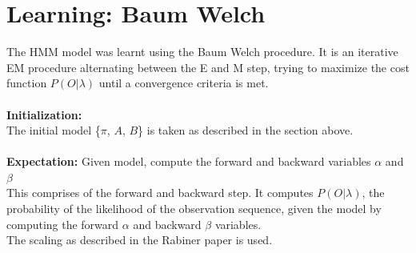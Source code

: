 \documentclass[english]{article}
\begin{document}
\section{Learning: Baum Welch}
The HMM model was learnt using the Baum Welch procedure. It is an iterative EM procedure alternating between the E and M step, trying to maximize the cost function $P(O|\lambda)$ until a convergence criteria is met. 
\\\\ \textbf{Initialization:}
\\The initial model \{$\pi$, $A$, $B$\} is taken as described in the section above.
\\\\ \textbf{Expectation:} 
Given model, compute the forward and backward variables $\alpha$ and $\beta$
\\This comprises of the forward and backward step. It computes $P(O|\lambda)$, the probability of the likelihood of the observation sequence, given the model by computing the forward $\alpha$ and backward $\beta$ variables. 
\\The scaling as described in the Rabiner paper \cite{c1} is used.
\end{document}
